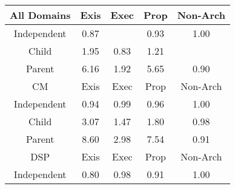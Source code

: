 \begin{tabular}{|c||c|c|c|c|}
\hline
All Domains & Exis & Exec & Prop & Non-Arch \\ 
\hline
Independent & \cellcolor[rgb]{0.8856344922383255,0.7246699299280734,0.39725885942243705} 0.87 &  & \cellcolor[rgb]{0.8965169256394889,0.7761801146935806,0.40741579726352295} 0.93 & \cellcolor[rgb]{0.9099359153560551,0.839969644116026,0.42} 1.00 \\ 
\hline
Child & \cellcolor[rgb]{0.8624067275406961,0.8174558183087507,0.41999999999999993} 1.95 & \cellcolor[rgb]{0.8790048382190097,0.693289567569979,0.3910711823377423} 0.83 & \cellcolor[rgb]{0.8994021903430385,0.834979984899334,0.42} 1.21 &  \\ 
\hline
Parent & \cellcolor[rgb]{0.6524122599754121,0.7179847547251952,0.42} 6.16 & \cellcolor[rgb]{0.8641530217428717,0.818283010299255,0.42} 1.92 & \cellcolor[rgb]{0.6777991506138554,0.7300101239749841,0.42} 5.65 & \cellcolor[rgb]{0.8918779689691285,0.7542223864538746,0.4030861043711865} 0.90 \\ 
\hline
\hline
CM & Exis & Exec & Prop & Non-Arch \\ 
\hline
Independent & \cellcolor[rgb]{0.898660886828842,0.7863281976565188,0.40941682770691923} 0.94 & \cellcolor[rgb]{0.9072653340602838,0.8270559145520096,0.4174476451229315} 0.99 & \cellcolor[rgb]{0.9032908226365242,0.8082432271462141,0.4137381011274225} 0.96 & \cellcolor[rgb]{0.909967283676586,0.8399845027941722,0.42} 1.00 \\ 
\hline
Child & \cellcolor[rgb]{0.80679498285554,0.7911134129315714,0.42} 3.07 & \cellcolor[rgb]{0.8865806581653207,0.8289066275519941,0.42} 1.47 & \cellcolor[rgb]{0.870111774518495,0.8211055774034975,0.42} 1.80 & \cellcolor[rgb]{0.9062026047105965,0.8220256622968237,0.4164557643965568} 0.98 \\ 
\hline
Parent & \cellcolor[rgb]{0.53,0.66,0.42} 8.60 & \cellcolor[rgb]{0.8112592550391017,0.7932280681764166,0.42} 2.98 & \cellcolor[rgb]{0.5829899275961503,0.6851004920192291,0.42} 7.54 & \cellcolor[rgb]{0.8929890318565097,0.7594814174541455,0.40412309639940897} 0.91 \\ 
\hline
\hline
DSP & Exis & Exec & Prop & Non-Arch \\ 
\hline
Independent & \cellcolor[rgb]{0.8727153554372122,0.663519349069471,0.3852009984080647} 0.80 & \cellcolor[rgb]{0.90695805412927,0.8256014562118774,0.4171608505206519} 0.98 & \cellcolor[rgb]{0.8930025788745892,0.7595455400063891,0.40413574028294996} 0.91 & \cellcolor[rgb]{0.9098205251576262,0.8399149856009808,0.42} 1.00 \\ 

\end{tabular}
